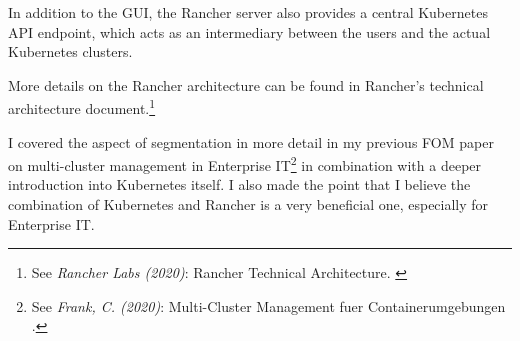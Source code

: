 In addition to the GUI, the Rancher server also provides a central Kubernetes API endpoint, which acts as an intermediary between the users and the actual Kubernetes clusters.

More details on the Rancher architecture can be found in Rancher's technical architecture document.\footnote{See \textit{Rancher Labs (2020)}: Rancher Technical Architecture. \cite{technicalArchitecture}}

I covered the aspect of segmentation in more detail in my previous FOM paper on multi-cluster management in Enterprise IT\footnote{See \textit{Frank, C. (2020)}: Multi-Cluster Management fuer Containerumgebungen .\cite{previousPaper}} in combination with a deeper introduction into Kubernetes itself. I also made the point that I believe the combination of Kubernetes and Rancher is a very beneficial one, especially for Enterprise IT.
